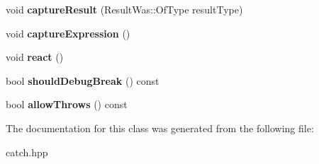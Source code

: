 \begin{DoxyCompactItemize}
\item 
\hypertarget{classCatch_1_1ResultBuilder_a10e467f7b7a4976e5d148b4d5066e8fd}{
void {\bfseries captureResult} (ResultWas::OfType resultType)}
\label{classCatch_1_1ResultBuilder_a10e467f7b7a4976e5d148b4d5066e8fd}

\item 
\hypertarget{classCatch_1_1ResultBuilder_af2ae2343965802eeeb0abbd4ea9d2d36}{
void {\bfseries captureExpression} ()}
\label{classCatch_1_1ResultBuilder_af2ae2343965802eeeb0abbd4ea9d2d36}

\item 
\hypertarget{classCatch_1_1ResultBuilder_a3085cdc46533d45bed6f652a2ac295c0}{
void {\bfseries react} ()}
\label{classCatch_1_1ResultBuilder_a3085cdc46533d45bed6f652a2ac295c0}

\item 
\hypertarget{classCatch_1_1ResultBuilder_a34cdbf7ad1e5b3cb4a94047f2d14bcb2}{
bool {\bfseries shouldDebugBreak} () const }
\label{classCatch_1_1ResultBuilder_a34cdbf7ad1e5b3cb4a94047f2d14bcb2}

\item 
\hypertarget{classCatch_1_1ResultBuilder_a3dbf18a3a4b00173dab052a8864e435e}{
bool {\bfseries allowThrows} () const }
\label{classCatch_1_1ResultBuilder_a3dbf18a3a4b00173dab052a8864e435e}

\end{DoxyCompactItemize}


The documentation for this class was generated from the following file:\begin{DoxyCompactItemize}
\item 
catch.hpp\end{DoxyCompactItemize}
